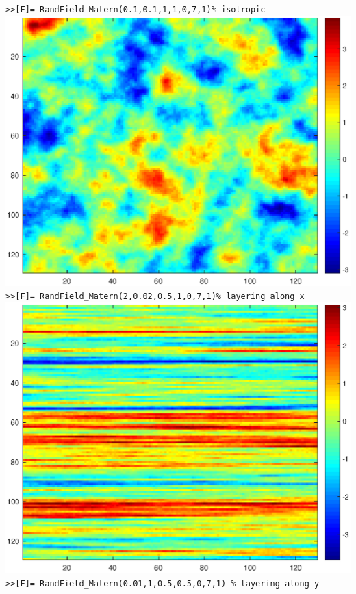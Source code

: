 \documentclass{extarticle}
\begin{document}
\vspace{1cm}
\texttt{>>[F]= RandField\_Matern(0.1,0.1,1,1,0,7,1)\% isotropic}\\
\centering
\includegraphics[scale=0.4]{f1.eps}\\
\texttt{>>[F]= RandField\_Matern(2,0.02,0.5,1,0,7,1)\% layering along x}\\
\centering
\includegraphics[scale=0.4]{f2.eps}\\
\texttt{>>[F]= RandField\_Matern(0.01,1,0.5,0.5,0,7,1) \% layering along y}\\
\centering
\end{document}
